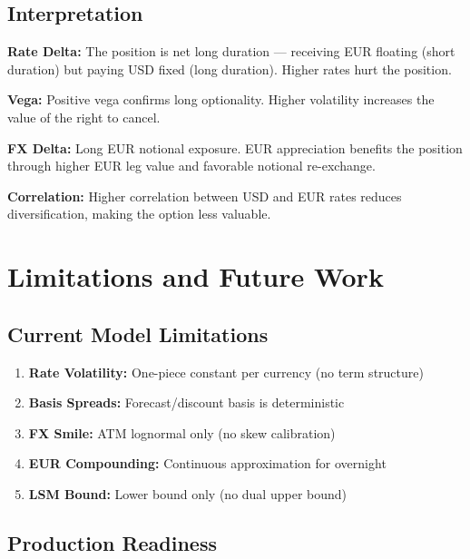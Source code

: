 \documentclass[10pt,a4paper]{article}
\begin{document}
\subsection{Interpretation}

\textbf{Rate Delta:}
The position is net long duration --- receiving EUR floating (short duration) but paying USD fixed (long duration). Higher rates hurt the position.

\textbf{Vega:}
Positive vega confirms long optionality. Higher volatility increases the value of the right to cancel.

\textbf{FX Delta:}
Long EUR notional exposure. EUR appreciation benefits the position through higher EUR leg value and favorable notional re-exchange.

\textbf{Correlation:}
Higher correlation between USD and EUR rates reduces diversification, making the option less valuable.

\newpage

\section{Limitations and Future Work}

\subsection{Current Model Limitations}

\begin{enumerate}
    \item \textbf{Rate Volatility:} One-piece constant per currency (no term structure)
    \item \textbf{Basis Spreads:} Forecast/discount basis is deterministic
    \item \textbf{FX Smile:} ATM lognormal only (no skew calibration)
    \item \textbf{EUR Compounding:} Continuous approximation for overnight
    \item \textbf{LSM Bound:} Lower bound only (no dual upper bound)
\end{enumerate}

\subsection{Production Readiness}
\end{document}
